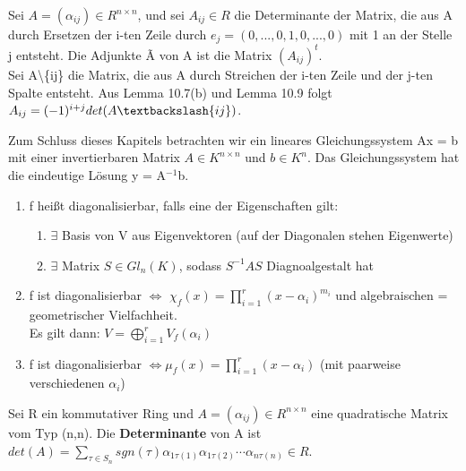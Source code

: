 \begin{definition}
Sei $A = (\alpha_{ij}) \in R^{n \times n}$, und sei $A_{ij} \in R$ die Determinante der Matrix, die aus A durch Ersetzen der i-ten Zeile durch $e_j = (0,...,0,1,0,...,0)$ mit 1 an der Stelle j entsteht. Die Adjunkte \~{A} von A ist die Matrix $(A_{ij})^t$.\\
Sei A\textbackslash\{ij\} die Matrix, die aus A durch Streichen der i-ten Zeile und der j-ten Spalte entsteht. Aus Lemma 10.7(b) und Lemma 10.9 folgt $A_{ij} =(-1)^{i+j} det(A\textbackslash\{ij\})$.
\end{definition}

Zum Schluss dieses Kapitels betrachten wir ein lineares Gleichungssystem Ax = b mit einer invertierbaren Matrix $A \in K^{n \times n}$ und $b \in K^n$. Das Gleichungssystem hat die eindeutige Lösung y = A$^{-1}$b.


\begin{theorem}
\leavevmode
\begin{enumerate}
	\item f heißt diagonalisierbar, falls eine der Eigenschaften gilt:
	\begin{enumerate}
		\item $\exists$ Basis von V aus Eigenvektoren (auf der Diagonalen stehen Eigenwerte)
		\item $\exists$ Matrix $S \in Gl_n(K)$, sodass $S^{-1}AS$ Diagnoalgestalt hat
	\end{enumerate}
	\item f ist diagonalisierbar $\Leftrightarrow$ $\chi_f(x) = \prod \limits_{i=1}^{r} (x- \alpha_i)^{m_i}$ und algebraischen = geometrischer Vielfachheit.\\Es gilt dann: $V=\bigoplus \limits_{i=1}^r V_f(\alpha_i)$
	\item f ist diagonalisierbar $\Leftrightarrow \mu_f(x) = \prod \limits_{i=1}^{r}(x-\alpha_i)$ (mit paarweise verschiedenen $\alpha_i$) 
\end{enumerate}
\end{theorem}


\begin{definition}
Sei R ein kommutativer Ring und $A = (\alpha_{ij}) \in R^{n \times n}$ eine quadratische Matrix vom Typ (n,n). Die \textbf{Determinante} von A ist $det(A) = \sum\nolimits_{\tau \in S_n} sgn(\tau) \alpha_{1\tau(1)} \alpha_{1 \tau(2)} \cdots \alpha_{n \tau(n)} \in R$.
\end{definition}

